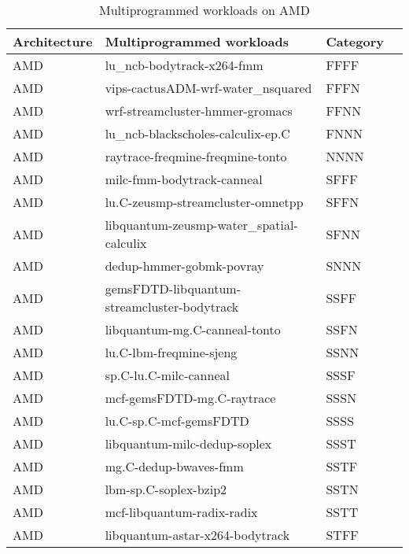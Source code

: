 \iffalse
\begin{table}[htb]
    \centering
    \caption{Multiprogrammed workloads on AMD}
    \begin{tabular}{@{}lllr@{}}
        \toprule 
        Architecture & Multiprogrammed workloads & Category \\
        \midrule
        
            AMD & lu\_ncb-bodytrack-x264-fmm                  & FFFF \\ 
            AMD & vips-cactusADM-wrf-water\_nsquared          & FFFN \\
            AMD & wrf-streamcluster-hmmer-gromacs             & FFNN \\
            AMD & lu\_ncb-blackscholes-calculix-ep.C          & FNNN \\ 
            AMD & raytrace-freqmine-freqmine-tonto            & NNNN \\
            AMD & milc-fmm-bodytrack-canneal                  & SFFF \\
            AMD & lu.C-zeusmp-streamcluster-omnetpp           & SFFN \\
            AMD & libquantum-zeusmp-water\_spatial-calculix   & SFNN \\
            AMD & dedup-hmmer-gobmk-povray                    & SNNN \\
            AMD & gemsFDTD-libquantum-streamcluster-bodytrack & SSFF \\
            AMD & libquantum-mg.C-canneal-tonto               & SSFN \\
            AMD & lu.C-lbm-freqmine-sjeng                     & SSNN \\
            AMD & sp.C-lu.C-milc-canneal                      & SSSF \\
            AMD & mcf-gemsFDTD-mg.C-raytrace                  & SSSN \\
            AMD & lu.C-sp.C-mcf-gemsFDTD                      & SSSS \\
            AMD & libquantum-milc-dedup-soplex                & SSST \\
            AMD & mg.C-dedup-bwaves-fmm                       & SSTF \\
            AMD & lbm-sp.C-soplex-bzip2                       & SSTN \\
            AMD & mcf-libquantum-radix-radix                  & SSTT \\
            AMD & libquantum-astar-x264-bodytrack             & STFF \\

\end{tabular}
\end{table}
